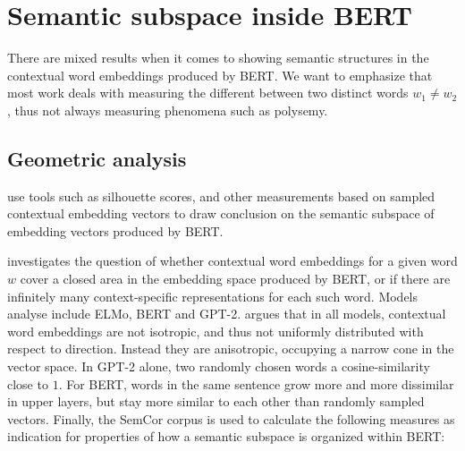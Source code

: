 \documentclass[a4paper,12pt,oneside,openright]{report}
\begin{document}
\section{Semantic subspace inside BERT}

There are mixed results when it comes to showing semantic structures in the contextual word embeddings produced by BERT.
We want to emphasize that most work deals with measuring the different between two distinct words $w_1 \neq w_2$, thus not always measuring phenomena such as polysemy. 

\subsection{Geometric analysis}

\cite{ethayarajh19, mickus19} use tools such as silhouette scores, and other measurements based on sampled contextual embedding vectors to draw conclusion on the semantic subspace of embedding vectors produced by BERT.

\cite{ethayarajh19} investigates the question of whether contextual word embeddings for a given word $w$ cover a closed area in the embedding space produced by BERT, or if there are infinitely many context-specific representations for each such word.
Models analyse include ELMo, BERT and GPT-2.
\cite{ethayarajh19} argues that in all models, contextual word embeddings are not isotropic, and thus not uniformly distributed with respect to direction.
Instead they are anisotropic, occupying a narrow cone in the vector space.
In GPT-2 alone, two randomly chosen words a cosine-similarity close to $1$.
For BERT, words in the same sentence grow more and more dissimilar in upper layers, but stay more similar to each other than randomly sampled vectors.
Finally, the SemCor corpus is used to calculate the following measures as indication for properties of how a semantic subspace is organized within BERT: \\
\end{document}
